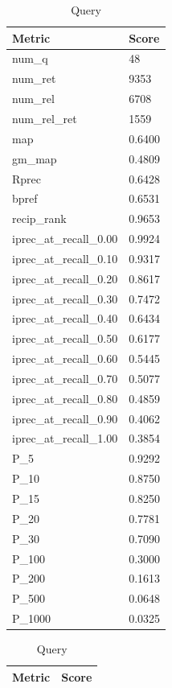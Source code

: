 \begin{table}[htb]
    \parbox{.45\linewidth}{
    \begin{tabular}{ | l | l | }
    \hline
    Metric & Score \\ \hline
	num\_q & 48 \\ \hline
	num\_ret & 9353 \\ \hline
	num\_rel & 6708 \\ \hline
	num\_rel\_ret & 1559 \\ \hline
	map & 0.6400 \\ \hline
	gm\_map & 0.4809 \\ \hline
	Rprec & 0.6428 \\ \hline
	bpref & 0.6531 \\ \hline
	recip\_rank & 0.9653 \\ \hline
	iprec\_at\_recall\_0.00 & 0.9924 \\ \hline
	iprec\_at\_recall\_0.10 & 0.9317 \\ \hline
	iprec\_at\_recall\_0.20 & 0.8617 \\ \hline
	iprec\_at\_recall\_0.30 & 0.7472 \\ \hline
	iprec\_at\_recall\_0.40 & 0.6434 \\ \hline
	iprec\_at\_recall\_0.50 & 0.6177 \\ \hline
	iprec\_at\_recall\_0.60 & 0.5445 \\ \hline
	iprec\_at\_recall\_0.70 & 0.5077 \\ \hline
	iprec\_at\_recall\_0.80 & 0.4859 \\ \hline
	iprec\_at\_recall\_0.90 & 0.4062 \\ \hline
	iprec\_at\_recall\_1.00 & 0.3854 \\ \hline
	P\_5 & 0.9292 \\ \hline
	P\_10 & 0.8750 \\ \hline
	P\_15 & 0.8250 \\ \hline
	P\_20 & 0.7781 \\ \hline
	P\_30 & 0.7090 \\ \hline
	P\_100 & 0.3000 \\ \hline
	P\_200 & 0.1613 \\ \hline
	P\_500 & 0.0648 \\ \hline
	P\_1000 & 0.0325 \\ \hline
    \end{tabular}
    \caption{Query}
    \label{table:manual-query}
    }
    \parbox{.45\linewidth}{
    \begin{tabular}{ | l | l | }
    \hline
    Metric & Score \\ \hline

\end{tabular}}
\end{table}
